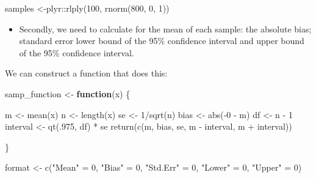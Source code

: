 \documentclass[
]{book}
\newenvironment{Shaded}{\begin{snugshade}}{\end{snugshade}}
\newcommand{\ControlFlowTok}[1]{\textcolor[rgb]{0.13,0.29,0.53}{\textbf{#1}}}
\newcommand{\DecValTok}[1]{\textcolor[rgb]{0.00,0.00,0.81}{#1}}
\newcommand{\FunctionTok}[1]{\textcolor[rgb]{0.00,0.00,0.00}{#1}}
\newcommand{\NormalTok}[1]{#1}
\newcommand{\OtherTok}[1]{\textcolor[rgb]{0.56,0.35,0.01}{#1}}
\newcommand{\SpecialCharTok}[1]{\textcolor[rgb]{0.00,0.00,0.00}{#1}}
\newcommand{\StringTok}[1]{\textcolor[rgb]{0.31,0.60,0.02}{#1}}
\providecommand{\tightlist}{%
  \setlength{\itemsep}{0pt}\setlength{\parskip}{0pt}}
\begin{document}
\begin{Shaded}
\begin{Highlighting}[]
\NormalTok{samples }\OtherTok{\textless{}{-}}\NormalTok{plyr}\SpecialCharTok{::}\FunctionTok{rlply}\NormalTok{(}\DecValTok{100}\NormalTok{, }\FunctionTok{rnorm}\NormalTok{(}\DecValTok{800}\NormalTok{, }\DecValTok{0}\NormalTok{, }\DecValTok{1}\NormalTok{))}
\end{Highlighting}
\end{Shaded}

\begin{itemize}
\tightlist
\item
  Secondly, we need to calculate for the mean of each sample: the absolute bias; standard error lower bound of the 95\% confidence interval and upper bound of the 95\% confidence interval.
\end{itemize}

We can construct a function that does this:

\begin{Shaded}
\begin{Highlighting}[]
\NormalTok{samp\_function }\OtherTok{\textless{}{-}} \ControlFlowTok{function}\NormalTok{(x) \{}
 
\NormalTok{  m }\OtherTok{\textless{}{-}} \FunctionTok{mean}\NormalTok{(x)}
\NormalTok{  n }\OtherTok{\textless{}{-}} \FunctionTok{length}\NormalTok{(x)}
\NormalTok{  se }\OtherTok{\textless{}{-}} \DecValTok{1}\SpecialCharTok{/}\FunctionTok{sqrt}\NormalTok{(n)}
\NormalTok{  bias }\OtherTok{\textless{}{-}} \FunctionTok{abs}\NormalTok{(}\SpecialCharTok{{-}}\DecValTok{0} \SpecialCharTok{{-}}\NormalTok{ m)}
\NormalTok{  df }\OtherTok{\textless{}{-}}\NormalTok{ n }\SpecialCharTok{{-}} \DecValTok{1}
\NormalTok{  interval }\OtherTok{\textless{}{-}} \FunctionTok{qt}\NormalTok{(.}\DecValTok{975}\NormalTok{, df) }\SpecialCharTok{*}\NormalTok{ se}
  \FunctionTok{return}\NormalTok{(}\FunctionTok{c}\NormalTok{(m, bias, se, m }\SpecialCharTok{{-}}\NormalTok{ interval, m }\SpecialCharTok{+}\NormalTok{ interval))}

\NormalTok{\}}

\NormalTok{format }\OtherTok{\textless{}{-}} \FunctionTok{c}\NormalTok{(}\StringTok{"Mean"} \OtherTok{=} \DecValTok{0}\NormalTok{, }\StringTok{"Bias"} \OtherTok{=} \DecValTok{0}\NormalTok{, }\StringTok{"Std.Err"} \OtherTok{=} \DecValTok{0}\NormalTok{, }\StringTok{"Lower"} \OtherTok{=} \DecValTok{0}\NormalTok{, }\StringTok{"Upper"} \OtherTok{=} \DecValTok{0}\NormalTok{)}
\end{Highlighting}
\end{Shaded}
\end{document}
